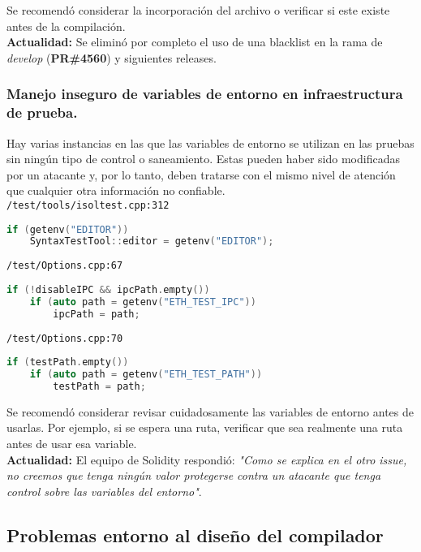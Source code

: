 Se recomendó considerar la incorporación del archivo o verificar si este existe antes de la compilación.\\

\textbf{Actualidad:} Se eliminó por completo el uso de una blacklist en la rama de \textit{develop} (\textbf{PR\#4560}\cite{GHPR4560}) y siguientes releases.\\

\subsubsection{Manejo inseguro de variables de entorno en infraestructura de prueba.}

Hay varias instancias en las que las variables de entorno se utilizan en las pruebas sin ningún tipo de control o saneamiento. Estas pueden haber sido modificadas por un atacante y, por lo tanto, deben tratarse con el mismo nivel de atención que cualquier otra información no confiable.\\

\verb|/test/tools/isoltest.cpp:312|
\begin{lstlisting}[language=c++]
if (getenv("EDITOR"))
    SyntaxTestTool::editor = getenv("EDITOR");
\end{lstlisting}

\verb|/test/Options.cpp:67|
\begin{lstlisting}[language=c++]
if (!disableIPC && ipcPath.empty())
    if (auto path = getenv("ETH_TEST_IPC"))
        ipcPath = path;
\end{lstlisting}

\verb|/test/Options.cpp:70|
\begin{lstlisting}[language=c++]
if (testPath.empty())
    if (auto path = getenv("ETH_TEST_PATH"))
        testPath = path;
\end{lstlisting}

Se recomendó considerar revisar cuidadosamente las variables de entorno antes de usarlas. Por ejemplo, si se espera una ruta, verificar que sea realmente una ruta antes de usar esa variable.\\

\textbf{Actualidad:} El equipo de Solidity respondió: \textit{"Como se explica en el otro issue, no creemos que tenga ningún valor protegerse contra un atacante que tenga control sobre las variables del entorno"}.\\

\subsection{Problemas entorno al diseño del compilador}

